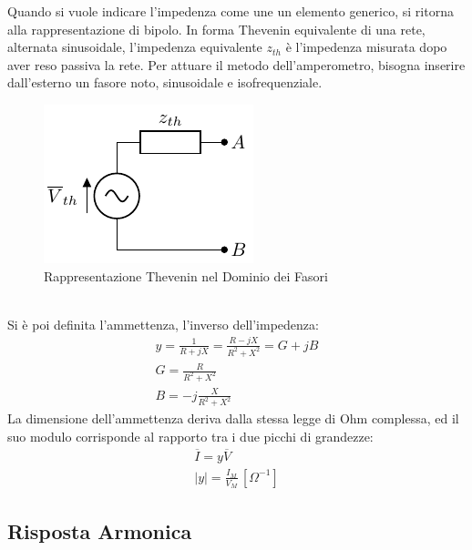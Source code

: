 \documentclass{article}
\numberwithin{equation}{subsection}
\begin{document}
Quando si vuole indicare l'impedenza come une un elemento generico, si ritorna alla rappresentazione di bipolo. In forma Thevenin equivalente di una rete, alternata 
sinusoidale, l'impedenza equivalente $z_{th}$ è l'impedenza misurata dopo aver reso passiva la rete. Per attuare il metodo dell'amperometro, bisogna inserire dall'esterno un 
fasore noto, sinusoidale e isofrequenziale. 
\begin{figure}[ht]%
    \centering
    \includegraphics{rappresentazione-thevenin-fasori.pdf}
    \caption{Rappresentazione Thevenin nel Dominio dei Fasori}
    \label{fig:rappresentazione-thevenin-fasori}
\end{figure}
\\
Si è poi definita l'ammettenza, l'inverso dell'impedenza:
\begin{gather*}
    y=\displaystyle\frac{1}{R+jX}=\frac{R-jX}{R^2+X^2}=G+jB\\
    G=\displaystyle\frac{R}{R^2+X^2}\\
    B=-j\displaystyle\frac{X}{R^2+X^2}
\end{gather*}
La dimensione dell'ammettenza deriva dalla stessa legge di Ohm complessa, ed il suo modulo corrisponde al rapporto tra i due picchi di grandezze:
\begin{gather*}
    \overline{I}=y\overline{V}\\
    |y|=\displaystyle\frac{I_M}{V_M}\,[\Omega^{-1}]
\end{gather*}

\subsection{Risposta Armonica}
\label{sec:risposta-armonica}
\end{document}

